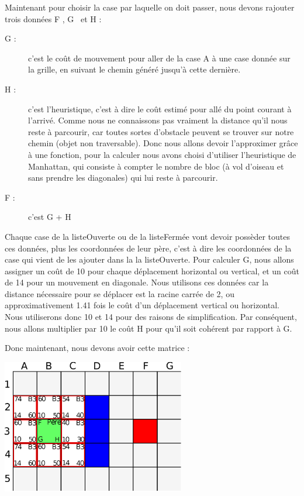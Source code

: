 			Maintenant pour choisir la case par laquelle on doit passer, nous devons rajouter trois données \og F \fg , \og G \fg \, et \og H \fg:
			\begin{description}
				\item[G : ]{c'est le coût de mouvement pour aller de la case A à une case donnée sur la grille, en suivant le chemin généré jusqu'à cette dernière.}
				\item[H :]{c'est l'heuristique, c'est à dire le coût estimé pour allé du point courant à l'arrivé. Comme nous ne connaissons pas vraiment la distance qu'il nous reste à parcourir, car toutes sortes d'obstacle peuvent se trouver sur notre chemin (objet non traversable). Donc nous allons devoir l'approximer grâce à une fonction, pour la calculer nous avons choisi d'utiliser l'heuristique de Manhattan, qui consiste à compter le nombre de bloc (à vol d'oiseau et sans prendre les diagonales) qui lui reste à parcourir.}
				\item[F :]{c'est G + H}
			\end{description} 
		
			Chaque case de la listeOuverte ou de la listeFermée vont devoir possèder toutes ces données, plus les coordonnées de leur père, c'est à dire les coordonnées de la case qui vient de les ajouter dans la la listeOuverte. Pour calculer G, nous allons assigner un coût de 10 pour chaque déplacement horizontal ou vertical, et un coût de 14 pour un mouvement en diagonale. Nous utilisons ces données car la distance nécessaire pour se déplacer est la racine carrée de 2, ou approximativement 1.41 fois le coût d'un déplacement vertical ou horizontal. Nous utiliserons donc 10 et 14 pour des raisons de simplification. Par conséquent, nous allons multiplier par 10 le coût H pour qu'il soit cohérent par rapport à G.
	
			Donc maintenant, nous devons avoir cette matrice :
			\begin{center}
				\includegraphics[width=8cm]{./Analyse/Img/Grille3.eps}
			\end{center}
		
